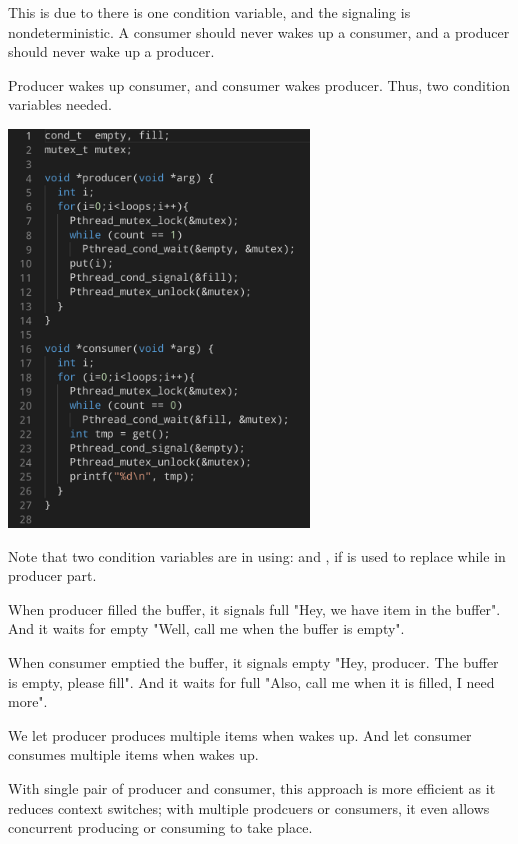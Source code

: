    This is due to there is one condition variable, and the signaling is nondeterministic. 
    A consumer should never wakes up a consumer, and a producer should never wake up a 
    producer.

    \vspace*{5mm}


    Producer wakes up consumer, and consumer wakes producer. Thus, two condition variables needed.

    \includegraphics[width=0.6\textwidth]{chapters/Cucurrency/Cucurrency/two_condition_variable_solution.png}

    Note that two condition variables are in using:  and , if is used to replace while in 
    producer part.

    When producer filled the buffer, it signals full "Hey, we have item in the buffer". And it waits for 
    empty "Well, call me when the buffer is empty".

    When consumer emptied the buffer, it signals empty "Hey, producer. The buffer is empty, please fill".
    And it waits for full "Also, call me when it is filled, I need more".

    \vspace*{5mm}


    We let producer produces multiple items when wakes up.
    And let consumer consumes multiple items when wakes up.

    With single pair of producer and consumer, this approach is more efficient as
    it reduces context switches; with multiple prodcuers or consumers, it even allows
    concurrent producing or consuming to take place.

